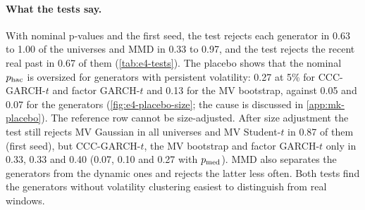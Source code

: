 \begin{table}[tbp]
  \centering
  \caption{Rejection shares of the multivariate tests across the 30 universes at $\alpha=0.05$
  (E4): real \TEST{} against one synthetic \TEST{}-length sample per seed, windows
  $(N,L)=(30,5)$, 123 per sample. \WC{}: time-block split, Driscoll--Kraay p-value; MMD: wild
  bootstrap, bandwidth fixed per universe. First: first synthetic seed; $\pmed$:
  $\min\{1,2\med_sp_s\}$ over two seeds. Placebo size: rejection rate when both samples are
  independent draws from the fitted generator (60 replications per generator,
  \cref{tab:e4-placebo}). Size-adjusted: p-values calibrated against the placebo scores of the
  same generator and test. Reference row: the last 615 days of real \TRAIN{} instead of a
  synthetic sample; it has no placebo. Rates only; Wilson 95\% intervals, which treat universes as
  independent, are in \cref{tab:e4-tests-full}.}
  \label{tab:e4-tests}
  \small
\end{table}

\paragraph{What the tests say.}
With nominal p-values and the first seed, the \WC{} test rejects each generator in 0.63 to 1.00
of the universes and MMD in 0.33 to 0.97, and the \WC{} test rejects the recent real past in 0.67
of them (\cref{tab:e4-tests}). The placebo shows that the
nominal $p_{\mathrm{hac}}$ is oversized for generators with persistent volatility: 0.27 at 5\% for
CCC-GARCH-$t$ and factor GARCH-$t$ and 0.13 for the MV bootstrap, against 0.05 and 0.07 for the
\iid{} generators (\cref{fig:e4-placebo-size}; the cause is discussed in \cref{app:mk-placebo}).
The reference row cannot be size-adjusted. After size adjustment the \WC{} test still rejects MV
Gaussian in all universes and MV Student-$t$ in 0.87 of them (first seed), but CCC-GARCH-$t$, the
MV bootstrap and factor GARCH-$t$ only in 0.33, 0.33 and 0.40 (0.07, 0.10 and 0.27 with $\pmed$).
MMD also separates the \iid{} generators from the dynamic ones and rejects the latter less often.
Both tests find the generators without volatility clustering easiest to distinguish from real
\TEST{} windows.

